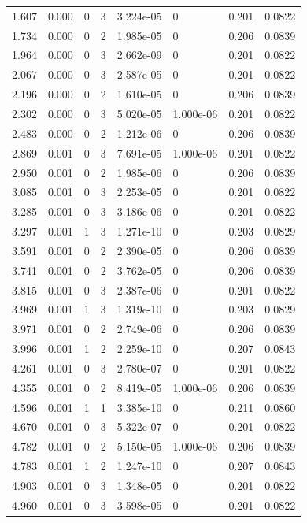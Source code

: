 \documentclass[preview]{standalone}
\begin{document}
{{\begin{tabular}{L{1.2cm}C{1.2cm} C{0.3cm}C{0.5cm} C{1.4cm}C{1.4cm} C{1.4cm}C{1.4cm}}
  1.607  &  0.000  & 0     &  3 &  3.224e-05  & 0  & 0.201 &  0.0822   \\ 
  1.734  &  0.000  & 0     &  2 &  1.985e-05  & 0  & 0.206 &  0.0839   \\ 
  1.964  &  0.000  & 0     &  3 &  2.662e-09  & 0  & 0.201 &  0.0822   \\ 
  2.067  &  0.000  & 0     &  3 &  2.587e-05  & 0  & 0.201 &  0.0822   \\ 
  2.196  &  0.000  & 0     &  2 &  1.610e-05  & 0  & 0.206 &  0.0839   \\ 
  2.302  &  0.000  & 0     &  3 &  5.020e-05  & 1.000e-06  & 0.201 &  0.0822   \\ 
  2.483  &  0.000  & 0     &  2 &  1.212e-06  & 0  & 0.206 &  0.0839   \\ 
  2.869  &  0.001  & 0     &  3 &  7.691e-05  & 1.000e-06  & 0.201 &  0.0822   \\ 
  2.950  &  0.001  & 0     &  2 &  1.985e-06  & 0  & 0.206 &  0.0839   \\ 
  3.085  &  0.001  & 0     &  3 &  2.253e-05  & 0  & 0.201 &  0.0822   \\ 
  3.285  &  0.001  & 0     &  3 &  3.186e-06  & 0  & 0.201 &  0.0822   \\ 
  3.297  &  0.001  & 1     &  3 &  1.271e-10  & 0  & 0.203 &  0.0829   \\ 
  3.591  &  0.001  & 0     &  2 &  2.390e-05  & 0  & 0.206 &  0.0839   \\ 
  3.741  &  0.001  & 0     &  2 &  3.762e-05  & 0  & 0.206 &  0.0839   \\ 
  3.815  &  0.001  & 0     &  3 &  2.387e-06  & 0  & 0.201 &  0.0822   \\ 
  3.969  &  0.001  & 1     &  3 &  1.319e-10  & 0  & 0.203 &  0.0829   \\ 
  3.971  &  0.001  & 0     &  2 &  2.749e-06  & 0  & 0.206 &  0.0839   \\ 
  3.996  &  0.001  & 1     &  2 &  2.259e-10  & 0  & 0.207 &  0.0843   \\ 
  4.261  &  0.001  & 0     &  3 &  2.780e-07  & 0  & 0.201 &  0.0822   \\ 
  4.355  &  0.001  & 0     &  2 &  8.419e-05  & 1.000e-06  & 0.206 &  0.0839   \\ 
  4.596  &  0.001  & 1     &  1 &  3.385e-10  & 0  & 0.211 &  0.0860   \\ 
  4.670  &  0.001  & 0     &  3 &  5.322e-07  & 0  & 0.201 &  0.0822   \\ 
  4.782  &  0.001  & 0     &  2 &  5.150e-05  & 1.000e-06  & 0.206 &  0.0839   \\ 
  4.783  &  0.001  & 1     &  2 &  1.247e-10  & 0  & 0.207 &  0.0843   \\ 
  4.903  &  0.001  & 0     &  3 &  1.348e-05  & 0  & 0.201 &  0.0822   \\ 
  4.960  &  0.001  & 0     &  3 &  3.598e-05  & 0  & 0.201 &  0.0822   \\ 
\hline 
\end{tabular} 

}}
\end{document}
